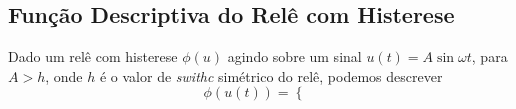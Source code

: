 
\subsection*{Função Descriptiva do Relê com Histerese}

Dado um relê com histerese $\phi\left( u \right)$ agindo sobre um sinal $u(t) = A\sin\omega t$, para $A>h$, onde $h$ é o valor de \emph{swithc} simétrico do relê, podemos descrever \[
\phi\left( u(t) \right) = \begin{cases}
    
\end{cases}
\] 

